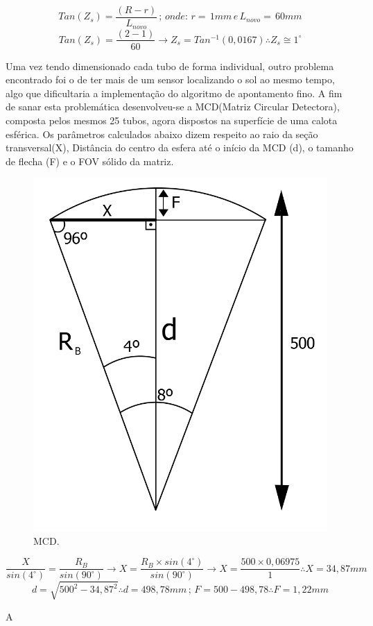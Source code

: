\documentclass[a4paper,12pt]{article}
\begin{document}
\newpage
$$Tan(Z_{s}) = \frac{(R-r)}{L_{novo}}  \, ; \,  onde: \, r= \,1mm \,e \, L_{novo}= \, 60mm $$
$$Tan(Z_{s}) = \frac{(2-1)}{60}  \longrightarrow   Z_{s} = Tan^{-1}(0,0167) \therefore Z_{s} \cong 1^{\circ} $$

Uma vez tendo dimensionado cada tubo de forma individual, outro problema encontrado foi o de ter mais de um sensor localizando o sol ao mesmo tempo, algo que dificultaria a implementação do algoritmo de apontamento fino. A fim de sanar esta problemática desenvolveu-se a MCD(Matriz Circular Detectora), composta pelos mesmos 25 tubos, agora dispostos na superfície de uma calota esférica. Os parâmetros calculados abaixo dizem respeito ao raio da seção transversal(X), Distância do centro da esfera até o início da MCD (d), o tamanho de flecha (F) e o FOV sólido da matriz.
\begin{figure}[htb] 
	\centering
	\includegraphics[scale=0.3]{MCD_2.jpg}
	\caption{MCD.}
\end{figure}
$$ \frac{X}{sin(4^{\circ})} = \frac{R_{B}}{sin(90^{\circ})}\longrightarrow X= \frac{R_{B}\times sin(4^{\circ})}{sin(90^{\circ})} \longrightarrow X=\frac{500\times 0,06975}{1} \therefore X=34,87mm $$
$$d = \sqrt{500^{2} - 34,87^{2}} \therefore d=498,78mm \, ;\, F=500-498,78 \therefore F=1,22mm $$

A
\end{document}
